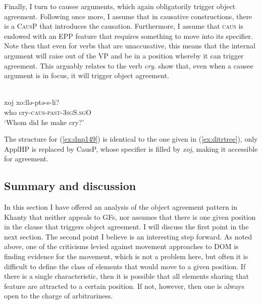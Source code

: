 \documentclass[output=paper
,modfonts
,nonflat]{langsci/langscibook}
\begin{document}
\noindent Finally, I turn to causee arguments, which again obligatorily trigger object agreement.
Following \citet{pylkkanen2008} once more, I assume that in causative constructions, there is a \textsc{CausP} that introduces the causation.
Furthermore, I assume that \textsc{caus} is endowed with an EPP feature that requires something to move into its specifier. Note then that even for verbs that are unaccusative, this means that the internal argument will raise out of the VP and be in a position whereby it can trigger agreement. This arguably relates to the verb \textit{cry}. \citeauthor{dn2011} show that, even when a causee argument is in focus, it will trigger object agreement.

\begin{exe}
\ex \citet[][149]{dn2011} \label{ex:dnp149}\\
{\gll xoj xo:llə-ptə-s-li?\\
who cry-\textsc{caus-past-3sgS.sgO}\\
\glt `Whom did he make cry?'}
\end{exe}

\noindent The structure for (\ref{ex:dnp149}) is identical to the one given in (\ref{ex:ditrtree}), only ApplHP is replaced by CausP, whose specifier is filled by \textit{xoj}, making it accessible for agreement.

\subsection{Summary and discussion}

In this section I have offered an analysis of the object agreement pattern in Khanty that neither appeals to GFs, nor assumes that there is one given position in the clause that triggers object agreement.
I will discuss the first point in the next section.
The second point I believe is an interesting step forward.
As noted above, one of the criticisms levied against movement approaches to DOM is finding evidence for the movement, which is not a problem here, but often it is difficult to define the class of elements that would move to a given position.
If there is a single characteristic, then it is possible that all elements sharing that feature are attracted to a certain position.
If not, however, then one is always open to the charge of arbitrariness.
\end{document}
